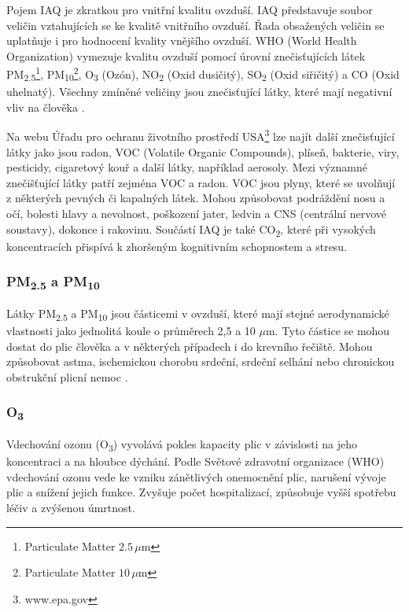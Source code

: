 Pojem IAQ je zkratkou pro vnitřní kvalitu ovzduší. IAQ představuje soubor veličin vztahujících se ke kvalitě vnitřního ovzduší. Řada obsažených veličin se uplatňuje i pro hodnocení kvality vnějšího ovzduší.
WHO (World Health Organization) vymezuje kvalitu ovzduší pomocí úrovní znečisťujících látek PM\textsubscript{2.5}\footnote{Particulate Matter $2.5\,\mu\text{m}$}, PM\textsubscript{10}\footnote{Particulate Matter $10\,\mu\text{m}$}, O\textsubscript{3} (Ozón), NO\textsubscript{2} (Oxid dusičitý), SO\textsubscript{2} (Oxid siřičitý) a CO (Oxid uhelnatý). Všechny zmíněné veličiny jsou znečisťující látky, které mají negativní vliv na člověka \parencite{worldhealthorganizationWHOGlobalAir2021}.

Na webu Úřadu pro ochranu životního prostředí USA\footnote{www.epa.gov} lze najít další znečisťující látky jako jsou radon, VOC (Volatile Organic Compounds), plíseň, bakterie, viry, pesticidy, cigaretový kouř a další látky, například aerosoly. Mezi významné znečišťující látky patří zejména VOC a radon. VOC jsou plyny, které se uvolňují z některých pevných či kapalných látek. Mohou způsobovat podráždění nosu a očí, bolesti hlavy a nevolnost, poškození jater, ledvin a CNS (centrální nervové soustavy), dokonce i rakovinu. \parencite{usepaIndoorPollutantsSources2015}
Součástí IAQ je také CO\textsubscript{2}, které při vysokých koncentracích přispívá k zhoršeným kognitivním schopnostem a stresu\parencite{dengImpactIndoorAir2024}.

\subsubsection{PM\textsubscript{2.5} a PM\textsubscript{10}}
Látky PM\textsubscript{2.5} a PM\textsubscript{10} jsou částicemi v ovzduší, které mají stejné aerodynamické vlastnosti jako jednolitá koule o průměrech 2,5 a 10 $\mu\text{m}$. Tyto částice se mohou dostat do plic člověka a v některých případech i do krevního řečiště. Mohou způsobovat astma, ischemickou chorobu srdeční, srdeční selhání nebo chronickou obstrukční plicní nemoc \parencite{usepaIndoorPollutantsSources2015}.

\subsubsection{O\textsubscript{3}}

Vdechování ozonu (O\textsubscript{3}) vyvolává pokles kapacity plic v závislosti na jeho koncentraci a na hloubce dýchání. Podle Světové zdravotní organizace (WHO) vdechování ozonu vede ke vzniku zánětlivých onemocnění plic, narušení vývoje plic a snížení jejich funkce. Zvyšuje počet hospitalizací, způsobuje vyšší spotřebu léčiv a zvýšenou úmrtnost. \parencite{worldhealthorganizationWHOGlobalAir2021}

